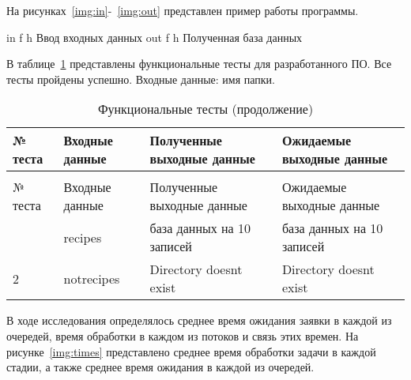 
На рисунках~\ref{img:in}-~\ref{img:out} представлен пример работы программы.

\FloatBarrier
{}
{in} %
{f} %
{h} %
{\textwidth} %
{Ввод входных данных} %
\FloatBarrier
\FloatBarrier
{}
{out} %
{f} %
{h} %
{\textwidth} %
{Полученная база данных} %
\FloatBarrier



В таблице~\ref{tbl:tests} представлены функциональные тесты для разработанного ПО. Все тесты пройдены успешно. Входные данные: имя папки.

\begin{longtable}{|p{}|p{}|p{}|p{}|}
    \caption{Функциональные тесты}\label{tbl:tests} \\\hline
    № теста & Входные данные & Полученные выходные данные & Ожидаемые выходные данные                                          \\\hline
    \endfirsthead
    \caption{Функциональные тесты (продолжение)} \\\hline
    № теста & Входные данные & Полученные выходные данные  & Ожидаемые выходные данные                                                 \\\hline
    \endhead
    \endfoot
    1                                           & recipes & база данных на 10 записей & база данных на 10 записей \\\hline
    2                                           & notrecipes & Directory doesnt exist & Directory doesnt exist \\\hline
    \end{longtable}


В ходе исследования определялось среднее время ожидания заявки в каждой из очередей, время обработки в каждом из потоков и связь этих времен.
На рисунке~\ref{img:times} представлено среднее время обработки задачи в каждой стадии, а также среднее время ожидания в каждой из очередей.

